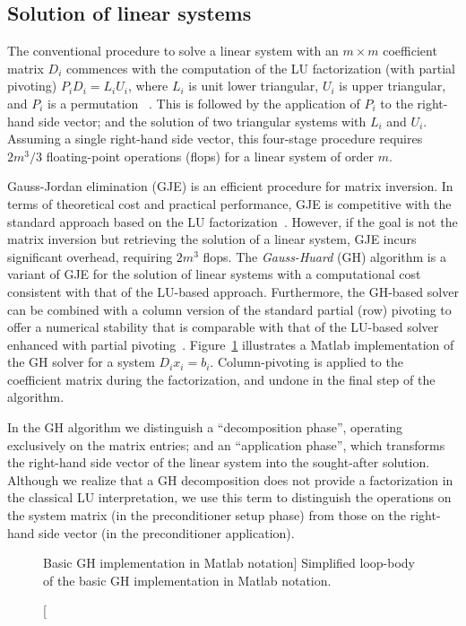 \subsection{Solution of linear systems}
The conventional procedure to solve a linear system with 
an $m\times m$ coefficient matrix $D_i$
commences with
the computation of the LU factorization (with partial pivoting)
$P_iD_i=L_iU_i$, where $L_i$ is unit lower triangular, $U_i$ is upper triangular, and $P_i$ is a permutation
~\cite{GVL3}. This is followed by the
application of $P_i$ to the right-hand side vector; and the solution
of two triangular systems with $L_i$ and $U_i$.
Assuming a single right-hand side vector, this four-stage procedure requires $2m^3/3$ floating-point operations (flops) for a linear system of order
$m$.

Gauss-Jordan elimination (GJE) is an efficient procedure for matrix inversion.
In terms of theoretical cost and practical performance, GJE is competitive with the standard
approach based on the LU factorization~\cite{doi:10.1137/S1064827598345679,CPE:CPE2933}.
However, if the goal is not the matrix inversion but retrieving the solution of a linear system,
GJE incurs significant overhead, requiring $2m^3$ flops.
The {\it Gauss-Huard} (GH) algorithm is a variant of GJE for the solution of linear systems
with a computational cost consistent with that of the LU-based approach.
Furthermore, the GH-based solver can be combined with a column version of the standard partial (row) pivoting
to offer a numerical stability that is comparable with that of the LU-based solver enhanced with partial pivoting~\cite{Dek97}.
Figure~\ref{2017-gh-block-jacobi:fig:gh} illustrates a Matlab implementation of the GH solver for a system
$D_i x_i = b_i$. 
Column-pivoting is applied to the coefficient matrix during the factorization,
and undone in the final step of the algorithm. 

In the GH algorithm we distinguish a ``decomposition phase'',
operating exclusively on the matrix entries; and an ``application phase'', which transforms the right-hand side 
vector of the linear system into the sought-after solution.
Although we realize that a GH decomposition does not provide a factorization
in the classical LU interpretation,
we use this term to distinguish the operations on the system matrix (in the preconditioner setup phase)
from those on the right-hand side vector (in the preconditioner application).

\begin{figure}[t]

\caption
[Basic GH implementation in Matlab notation]
{Simplified loop-body of the basic GH implementation in Matlab notation.}
\label{2017-gh-block-jacobi:fig:gh}
\end{figure}

